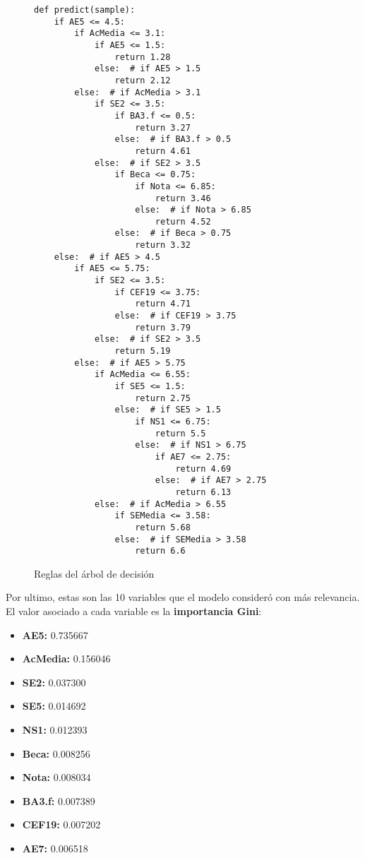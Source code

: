 \begin{figure}[!htbp]
	\begin{lstlisting}
def predict(sample):
    if AE5 <= 4.5:
        if AcMedia <= 3.1:
            if AE5 <= 1.5:
                return 1.28
            else:  # if AE5 > 1.5
                return 2.12
        else:  # if AcMedia > 3.1
            if SE2 <= 3.5:
                if BA3.f <= 0.5:
                    return 3.27
                else:  # if BA3.f > 0.5
                    return 4.61
            else:  # if SE2 > 3.5
                if Beca <= 0.75:
                    if Nota <= 6.85:
                        return 3.46
                    else:  # if Nota > 6.85
                        return 4.52
                else:  # if Beca > 0.75
                    return 3.32
    else:  # if AE5 > 4.5
        if AE5 <= 5.75:
            if SE2 <= 3.5:
                if CEF19 <= 3.75:
                    return 4.71
                else:  # if CEF19 > 3.75
                    return 3.79
            else:  # if SE2 > 3.5
                return 5.19
        else:  # if AE5 > 5.75
            if AcMedia <= 6.55:
                if SE5 <= 1.5:
                    return 2.75
                else:  # if SE5 > 1.5
                    if NS1 <= 6.75:
                        return 5.5
                    else:  # if NS1 > 6.75
                        if AE7 <= 2.75:
                            return 4.69
                        else:  # if AE7 > 2.75
                            return 6.13
            else:  # if AcMedia > 6.55
                if SEMedia <= 3.58:
                    return 5.68
                else:  # if SEMedia > 3.58
                    return 6.6
	\end{lstlisting}
\caption{Reglas del árbol de decisión}
\label{fig:tree_rules}
\end{figure}
\pagebreak
Por ultimo, estas son las 10 variables que el modelo consideró con más relevancia. El valor asociado a cada variable es la \textbf{importancia Gini}:
\begin{itemize}
    \item \textbf{AE5:}    0.735667
    \item \textbf{AcMedia:} 0.156046
    \item \textbf{SE2:}    0.037300
    \item \textbf{SE5:}    0.014692
    \item \textbf{NS1:}    0.012393
    \item \textbf{Beca:}      0.008256
    \item \textbf{Nota:}      0.008034
    \item \textbf{BA3.f:}    0.007389
    \item \textbf{CEF19:}    0.007202
    \item \textbf{AE7:}    0.006518
\end{itemize}
